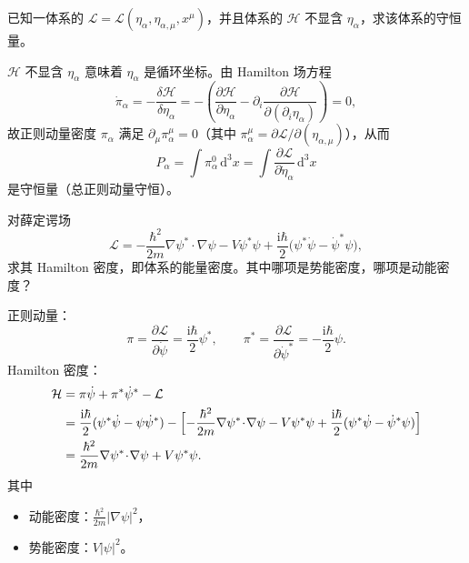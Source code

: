 \begin{question}
已知一体系的 \(\mathcal L=\mathcal L(\eta_\alpha,\eta_{\alpha,\mu},x^\mu)\)，并且体系的 \(\mathcal H\) 不显含 \(\eta_\alpha\)，求该体系的守恒量。
\begin{solution}
\(\mathcal H\) 不显含 \(\eta_\alpha\) 意味着 \(\eta_\alpha\) 是循环坐标。由 Hamilton 场方程
\[
\dot\pi_\alpha =-\frac{\delta\mathcal H}{\delta\eta_\alpha}
= -\left(\frac{\partial\mathcal H}{\partial\eta_\alpha}
-\partial_i\frac{\partial\mathcal H}{\partial(\partial_i\eta_\alpha)}\right)=0,
\]
故正则动量密度 \(\pi_\alpha\) 满足 \(\partial_\mu\pi_\alpha^\mu=0\)（其中 \(\pi_\alpha^\mu=\partial\mathcal L/\partial(\eta_{\alpha,\mu})\)），从而
\[
P_\alpha=\int\pi_\alpha^0\,\mathrm d^3x=\int\frac{\partial\mathcal L}{\partial\dot\eta_\alpha}\,\mathrm d^3x
\]
是守恒量（总正则动量守恒）。
\end{solution}
\end{question}

\begin{question}
对薛定谔场
\[
\mathcal L = -\frac{\hbar^2}{2m}\nabla\psi^*\!\cdot\!\nabla\psi
-V\psi^*\psi+\frac{\mathrm i\hbar}{2}\bigl(\psi^*\dot\psi-\dot\psi^*\psi\bigr),
\]
求其 Hamilton 密度，即体系的能量密度。其中哪项是势能密度，哪项是动能密度？
\begin{solution}
正则动量：
\[
\pi=\frac{\partial\mathcal L}{\partial\dot\psi}=\frac{\mathrm i\hbar}{2}\psi^*,\qquad
\pi^*=\frac{\partial\mathcal L}{\partial\dot\psi^*}=-\frac{\mathrm i\hbar}{2}\psi .
\]
Hamilton 密度：
\[
\begin{aligned}
\mathcal H &=\pi\dot\psi+\pi^*\dot\psi^*-\mathcal L \\
&=\frac{\mathrm i\hbar}{2}(\psi^*\dot\psi-\psi\dot\psi^*)
-\Bigl[-\frac{\hbar^2}{2m}\nabla\psi^*\!\cdot\!\nabla\psi
-V\psi^*\psi+\frac{\mathrm i\hbar}{2}(\psi^*\dot\psi-\dot\psi^*\psi)\Bigr] \\
&=\frac{\hbar^2}{2m}\nabla\psi^*\!\cdot\!\nabla\psi+V\psi^*\psi .
\end{aligned}
\]
其中
\begin{itemize}
  \item 动能密度：\(\displaystyle \frac{\hbar^2}{2m}|\nabla\psi|^2\)，
  \item 势能密度：\(\displaystyle V|\psi|^2\)。
\end{itemize}
\end{solution}
\end{question}

